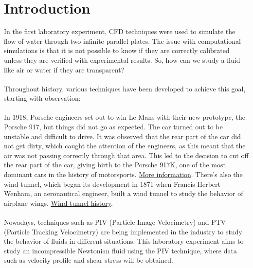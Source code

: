 \documentclass{article} %
\begin{document}

\setcounter{page}{1} %
\section{Introduction}

In the first laboratory experiment, CFD techniques were used to simulate the flow of water through two infinite parallel plates. The issue with computational simulations is that it is not possible to know if they are correctly calibrated unless they are verified with experimental results. So, how can we study a fluid like air or water if they are transparent?
\\ \\
Throughout history, various techniques have been developed to achieve this goal, starting with observation:
\\ \\
In 1918, Porsche engineers set out to win Le Mans with their new prototype, the Porsche 917, but things did not go as expected. The car turned out to be unstable and difficult to drive. It was observed that the rear part of the car did not get dirty, which caught the attention of the engineers, as this meant that the air was not passing correctly through that area. This led to the decision to cut off the rear part of the car, giving birth to the Porsche 917K, one of the most dominant cars in the history of motorsports. \href{https://automedia.revsinstitute.org/1971-porsche-917k}{More information}. There's also the wind tunnel, which began its development in 1871 when Francis Herbert Wenham, an aeronautical engineer, built a wind tunnel to study the behavior of airplane wings. \href{https://www.grc.nasa.gov/www/k-12/WindTunnel/history.html}{Wind tunnel history}.
\\ \\
Nowadays, techniques such as PIV (Particle Image Velocimetry) and PTV (Particle Tracking Velocimetry) are being implemented in the industry to study the behavior of fluids in different situations. 
This laboratory experiment aims to study an incompressible Newtonian fluid using the PIV technique, where data such as velocity profile and shear stress will be obtained.
\end{document}
